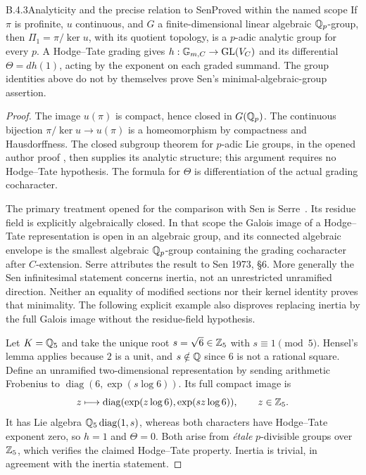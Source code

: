 \begin{result}{B.4.3}{Analyticity and the precise relation to Sen}{Proved within the named scope}
If $\pi$ is profinite, $u$ continuous, and $G$ a
finite-dimensional linear algebraic $\mathbb Q_p$-group, then
$\Pi_1=\pi/\ker u$, with its quotient topology, is a
$p$-adic analytic group for every $p$. A Hodge--Tate grading
gives $h:\mathbb G_{m,C}\to\operatorname{GL}(V_C)$ and its differential
$\Theta=dh(1)$, acting by the exponent on each graded summand.
The group identities above do not by themselves prove Sen's
minimal-algebraic-group assertion.
\end{result}
\begin{proof}
The image $u(\pi)$ is compact, hence closed in $G(\mathbb Q_p)$.
The continuous bijection $\pi/\ker u\to u(\pi)$ is a
homeomorphism by compactness and Hausdorffness. The closed
subgroup theorem for $p$-adic Lie groups, in the opened author
proof \cite[Corollary 19.14]{Pstragowski2023}, then supplies its
analytic structure; this argument requires no Hodge--Tate
hypothesis. The formula for $\Theta$ is differentiation of
the actual grading cocharacter.

The primary treatment opened for the comparison with Sen is
Serre~\cite[\S1.1, \S1.3 Theorems 1 and $1'$, \S1.4
Theorem 2 and its equivalent forms]{Serre1979HodgeTate}.
Its residue field is explicitly algebraically closed. In that
scope the Galois image of a Hodge--Tate representation is
open in an algebraic group, and its connected algebraic
envelope is the smallest algebraic $\mathbb Q_p$-group containing
the grading cocharacter after $C$-extension. Serre attributes
the result to Sen 1973, \S6. More generally the Sen
infinitesimal statement concerns inertia, not an unrestricted
unramified direction. Neither an equality of modified
sections nor their kernel identity proves that minimality.
The following explicit example also disproves replacing
inertia by the full Galois image without the residue-field
hypothesis.

Let $K=\mathbb Q_5$ and take the unique root
$s=\sqrt6\in\mathbb Z_5$ with $s\equiv1\pmod5$.
Hensel's lemma applies because $2$ is a unit, and $s\notin\mathbb Q$
since $6$ is not a rational square. Define an unramified
two-dimensional representation by sending arithmetic Frobenius
to $\operatorname{diag}(6,\exp(s\log6))$. Its full compact
image is
\[
 z\longmapsto
     \operatorname{diag}(\exp(z\log6),\exp(sz\log6)),
                       \qquad z\in\mathbb Z_5.
\]
It has Lie algebra $\mathbb Q_5\operatorname{diag}(1,s)$, whereas
both characters have Hodge--Tate exponent zero, so $h=1$
and $\Theta=0$. Both arise from \emph{\'etale} $p$-divisible
groups over $\mathbb Z_5$, which verifies the claimed Hodge--Tate
property. Inertia is trivial, in agreement with the inertia
statement.


\end{proof}
